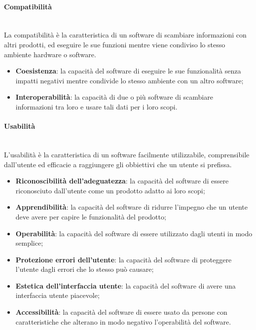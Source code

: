	\paragraph{Compatibilità} \mbox{}\\
	La compatibilità è la caratteristica di un software di scambiare informazioni con altri prodotti, ed eseguire le sue funzioni mentre viene condiviso lo stesso ambiente hardware o software.
	\begin{itemize}
		\item \textbf{Coesistenza}: la capacità del software di eseguire le sue funzionalità senza impatti negativi mentre condivide lo stesso ambiente con un altro software;
		\item \textbf{Interoperabilità}: la capacità di due o più software di scambiare informazioni tra loro e usare tali dati per i loro scopi.
	\end{itemize}
	\paragraph{Usabilità} \mbox{}\\
	L'usabilità è la caratteristica di un software facilmente utilizzabile, comprensibile dall'utente ed efficacie a raggiungere gli obbiettivi che un utente si prefissa.
	\begin{itemize}
		\item \textbf{Riconoscibilità dell'adeguatezza}: la capacità del software di essere riconosciuto dall'utente come un prodotto adatto ai loro scopi;
		\item \textbf{Apprendibilità}: la capacità del software di ridurre l'impegno che un utente deve avere per capire le funzionalità del prodotto;
		\item \textbf{Operabilità}: la capacità del software di essere utilizzato dagli utenti in modo semplice;
		\item \textbf{Protezione errori dell'utente}: la capacità del software di proteggere l'utente dagli errori che lo stesso può causare;
		\item \textbf{Estetica dell'interfaccia utente}: la capacità del software di avere una interfaccia utente piacevole;
		\item \textbf{Accessibilità}: la capacità del software di essere usato da persone con caratteristiche che alterano in modo negativo l'operabilità del software.
	\end{itemize}
